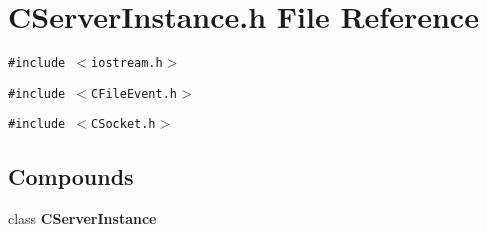 \section{CServer\-Instance.h File Reference}
\label{CServerInstance_8h}
{\tt \#include $<$iostream.h$>$}\par
{\tt \#include $<$CFile\-Event.h$>$}\par
{\tt \#include $<$CSocket.h$>$}\par
\subsection*{Compounds}
\begin{CompactItemize}
\item 
class {\bf CServer\-Instance}
\end{CompactItemize}
